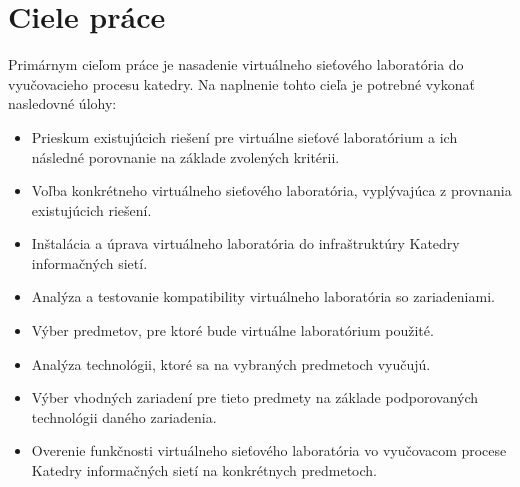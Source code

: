 \chapter{Ciele práce}

Primárnym cieľom práce je nasadenie virtuálneho sieťového laboratória do vyučovacieho procesu katedry. Na naplnenie tohto cieľa je potrebné vykonať nasledovné úlohy:

\begin{itemize}[noitemsep]
    \item Prieskum existujúcich riešení pre virtuálne sieťové laboratórium a ich následné porovnanie na základe zvolených kritérii.
    \item Voľba konkrétneho virtuálneho sieťového laboratória, vyplývajúca z provnania existujúcich riešení.
    \item Inštalácia a úprava virtuálneho laboratória do infraštruktúry Katedry informačných sietí.
    \item Analýza a testovanie kompatibility virtuálneho laboratória so zariadeniami.
    \item Výber predmetov, pre ktoré bude virtuálne laboratórium použité.
    \item Analýza technológii, ktoré sa na vybraných predmetoch vyučujú.
    \item Výber vhodných zariadení pre tieto predmety na základe podporovaných technológii daného zariadenia.
    \item Overenie funkčnosti virtuálneho sieťového laboratória vo vyučovacom procese Katedry informačných sietí na konkrétnych predmetoch.
\end{itemize}